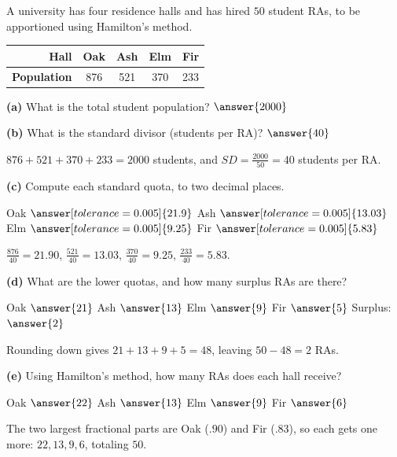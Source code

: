 \documentclass[12pt]{ximera}
\begin{document}
\begin{problem}
A university has four residence halls and has hired $50$ student RAs, to be apportioned
using Hamilton's method.
\begin{center}
\begin{tabular}{|r|c|c|c|c|}\hline
\textbf{Hall} & Oak & Ash & Elm & Fir\\\hline
\textbf{Population} & 876 & 521 & 370 & 233\\\hline
\end{tabular}
\end{center}

\begin{prompt}
\textbf{(a)} What is the total student population? $\answer{2000}$

\textbf{(b)} What is the standard divisor (students per RA)? $\answer{40}$

\begin{feedback}
$876+521+370+233=2000$ students, and $SD=\frac{2000}{50}=40$ students per RA.
\end{feedback}
\end{prompt}

\begin{prompt}
\textbf{(c)} Compute each standard quota, to two decimal places.

Oak $\answer[tolerance=0.005]{21.9}$ \quad Ash $\answer[tolerance=0.005]{13.03}$ \quad
Elm $\answer[tolerance=0.005]{9.25}$ \quad Fir $\answer[tolerance=0.005]{5.83}$

\begin{feedback}
$\frac{876}{40}=21.90$, $\frac{521}{40}=13.03$, $\frac{370}{40}=9.25$, $\frac{233}{40}=5.83$.
\end{feedback}
\end{prompt}

\begin{prompt}
\textbf{(d)} What are the lower quotas, and how many surplus RAs are there?

Oak $\answer{21}$ \quad Ash $\answer{13}$ \quad Elm $\answer{9}$ \quad Fir $\answer{5}$
\qquad Surplus: $\answer{2}$

\begin{feedback}
Rounding down gives $21+13+9+5=48$, leaving $50-48=2$ RAs.
\end{feedback}
\end{prompt}

\begin{prompt}
\textbf{(e)} Using Hamilton's method, how many RAs does each hall receive?

Oak $\answer{22}$ \quad Ash $\answer{13}$ \quad Elm $\answer{9}$ \quad Fir $\answer{6}$

\begin{feedback}
The two largest fractional parts are Oak ($.90$) and Fir ($.83$), so each gets one more:
$22, 13, 9, 6$, totaling $50$. \checkmark
\end{feedback}
\end{prompt}
\end{problem}
\end{document}
